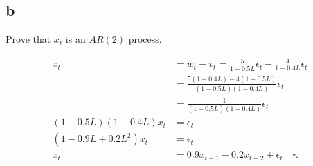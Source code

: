 \subsection{b} 
\label{section_2_b}
Prove that $x_t$ is an $AR(2)$ process.

\begin{solution}

\begin{equation}
\begin{aligned}
										x_t & = w_t - v_t = \frac{5}{1 - 0.5L}\epsilon_t - \frac{4}{1 - 0.4L}\epsilon_t \\
												& = \frac{5(1 - 0.4L) - 4(1 - 0.5L)}{(1 - 0.5L)(1 - 0.4L)}\epsilon_t \\
												& = \frac{1}{(1 - 0.5L)(1 - 0.4L)} \epsilon_t \\
(1 - 0.5L)(1 - 0.4L)x_t	& = \epsilon_t \\
  (1 -0.9L + 0.2L^2)x_t & = \epsilon_t \\
									  x_t & = 0.9x_{t-1} - 0.2x_{t-2} + \epsilon_t \quad \square.\\
\end{aligned}
\end{equation}

\end{solution}

